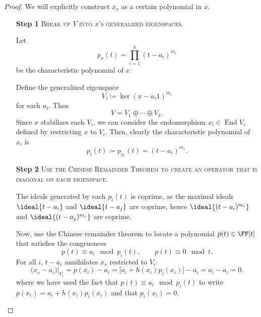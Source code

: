 \documentclass{article}
\DeclarePairedDelimiter\ideal\langle\rangle
\DeclareMathOperator{\End}{End}
\begin{document}
\begin{proof}
    We will explicitly construct $x_s$ as a certain polynomial in $x$.

    \begin{itemize}
        \item[\textbf{Step 1}] 
            \textsc{\color{Crimson} Break up $V$ into $x$'s generalized eigenspaces.}

            Let
            \[
                p_x(t)
                =
                \prod_{i=1}^k
                (t - a_i)^{m_i}
            \]
            be the characteristic polynomial of $x$.

            Define the generalized eigenspace
            \[
                V_i
                \coloneq
                \ker (x - a_i 1)^{m_i}
            \]
            for each $a_i$.
            Then
            \[
                V 
                =
                V_1 \oplus \cdots \oplus V_k.
            \]
            Since $x$ stabilizes each $V_i$, we can consider the endomorphism $x_i \in \End V_i$ defined by restricting $x$ to $V_i$.
            Then, clearly the characteristic polynomial of $x_i$ is
            \[
                p_i(t)
                \coloneq
                p_{x_i}(t)
                =
                (t-a_i)^{m_i}.
            \]
        \item[\textbf{Step 2}] 
            \textsc{\color{Crimson} Use the Chinese Remainder Theorem to create an operator that is diagonal on each eigenspace.}

            The ideals generated by each $p_i(t)$ is coprime, as
            the maximal ideals $\ideal{t-a_i}$ and $\ideal{t-a_j}$ are coprime, hence $\ideal{(t-a_i)^{m_i}}$ and $\ideal{(t-a_j)^{m_j}}$ are coprime.

            Now, use the Chinese remainder theorem to locate a polynomial $p(t) \in \FF[t]$ that satisfies the congruences
            \[
                p(t)
                \equiv
                a_i \mod p_i(t)
                ,\qquad
                p(t)
                \equiv
                0 \mod t.
            \]
            For all $i$, $t - a_i$ annihilates $x_s$ restricted to $V_i$:
            \[
                \big(x_s - a_i\big)\big\rvert_{V_i}
                =
                p(x_i) - a_i
                =
                \big[a_i + h(x_i)p_i(x_i)\big] - a_i
                =
                a_i - a_i
                =
                0.
            \]
            where we have used the fact that $p(t) \equiv a_i \mod p_i(t)$ to write $p(x_i) = a_i + h(x_i)p_i(x_i)$ and that $p_i(x_i) = 0$.


\end{itemize}
\end{proof}
\end{document}
